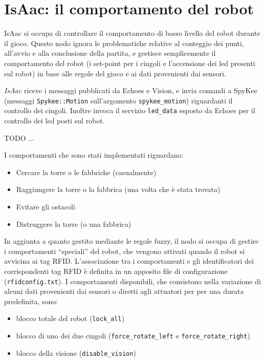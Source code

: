 \section{IsAac: il comportamento del robot}
IsAac si occupa di controllare il comportamento di basso livello del robot durante il gioco. Questo nodo ignora le problematiche relative al conteggio dei punti, all'avvio e alla conclusione della partita, e gestisce semplicemente il comportamento del robot (i set-point per i cingoli e l'accensione dei led presenti sul robot) in base alle regole del gioco e ai dati provenienti dai sensori. 

 \emph{IsAac} riceve i messaggi pubblicati da Echoes e Vision, e invia comandi a SpyKee (messaggi \verb|Spykee::Motion| sull'argomento \verb|spykee_motion|) riguardanti il controllo dei cingoli. Inoltre invoca il servizio \verb|led_data| esposto da Echoes per il controllo dei led posti sul robot.


TODO ...

I comportamenti che sono stati implementati riguardano:
\begin{itemize}
 \item Cercare la torre o le fabbriche (casualmente)
 \item Raggiungere la torre o la fabbrica (una volta che è stata trovata)
 \item Evitare gli ostacoli
 \item Distruggere la torre (o una fabbrica)
\end{itemize}


In aggiunta a quanto gestito mediante le regole fuzzy, il nodo si occupa di gestire i comportamenti ``speciali'' del robot, che vengono attivati quando il robot si avvicina ai tag RFID. L'associazione tra i comportamenti e gli identificatori dei corrispondenti tag RFID è definita in un apposito file di configurazione (\verb|rfidconfig.txt|). I comportamenti disponibili, che consistono nella variazione di alcuni dati provenienti dai sensori o diretti agli attuatori per per una durata predefinita, sono:
\begin{itemize}
 \item blocco totale del robot (\verb|lock_all|)
 \item blocco di uno dei due cingoli (\verb|force_rotate_left| e \verb|force_rotate_right|)
 \item blocco della visione (\verb|disable_vision|)
\end{itemize}

